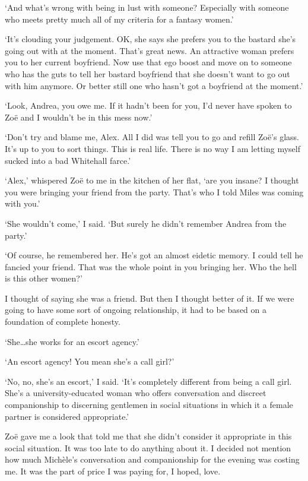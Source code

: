 `And what's wrong with being in lust with someone? Especially with
someone who meets pretty much all of my criteria for a fantasy
women.'

`It's clouding your judgement. OK, she says she prefers you to the bastard
she's going out with at the moment. That's great news. An attractive
woman prefers you to her current boyfriend. Now use that ego boost
and move on to someone who has the guts to tell her bastard
boyfriend that she doesn't want to go out with him anymore. Or
better still one who hasn't got a boyfriend at the moment.'

`Look, Andrea, you owe me. If it hadn't been for you, I'd never have
spoken to Zoë and I wouldn't be in this mess now.'

`Don't try and blame me, Alex. All I did was tell you to go and
refill Zoë's glass. It's up to you to sort things. This is real life. There is no
way I am letting myself sucked into a bad Whitehall farce.'

`Alex,' whispered Zoë to me in the kitchen of her flat, `are you
insane? I thought you were bringing your friend from the party.
That's who I told Miles was coming with you.'

`She wouldn't come,' I said. `But surely he didn't remember Andrea
from the party.'

`Of course, he remembered her. He's got an almost eidetic memory. I
could tell he fancied your friend. That was the whole point in you
bringing her. Who the hell is this other women?'

I thought of saying she was a friend. But then I thought better of
it. If we were going to have some sort of ongoing relationship, it
had to be based on a foundation of complete honesty.

`She\dots she works for an escort agency.'

`An escort agency! You mean she's a call girl?'

`No, no, she's an escort,' I said. `It's completely different from
being a call girl. She's a university-educated woman who offers
conversation and discreet companionship to discerning gentlemen in
social situations in which it a female partner is considered
appropriate.'

Zoë gave me a look that told me that she didn't consider it
appropriate in this social situation. It was too late to do anything
about it. I decided not mention how much Michèle's conversation
and companionship for the evening was costing me. It was the part of
price I was paying for, I hoped, love.

